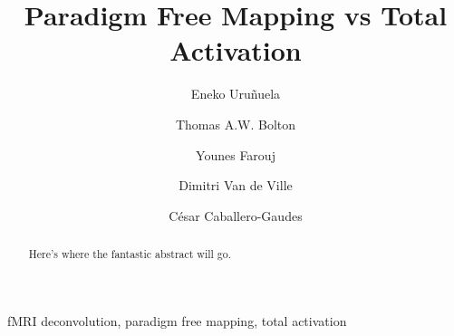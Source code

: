 \documentclass[5p]{elsarticle}
\begin{document}
\begin{frontmatter}

\title{Paradigm Free Mapping vs Total Activation}

\author[bcbl,upv]{Eneko Uru\~nuela}

\author[japan]{Thomas A.W. Bolton}
\author[epfl]{Younes Farouj}
\author[epfl,unige]{Dimitri Van de Ville}
\author[bcbl]{C\'{e}sar Caballero-Gaudes}

\address[bcbl]{Basque Center on Cognition, Brain and Language (BCBL), Donostia-San Sebasti\'{a}n, Spain.}
\address[upv]{University of the Basque Country, Donostia-San Sebasti\'{a}n, Spain.}
\address[japan]{Department of Decoded Neurofeedback, ATR Computational Neuroscience Laboratories, Kyoto, Japan}
\address[epfl]{Swiss Federal Institute of Technology Lausanne (EPFL), Lausanne, Switzerland.}
\address[unige]{Faculty of Medicine of the University of Geneva, Geneva, Switzerland}

\begin{abstract}
Here's where the fantastic abstract will go.
\end{abstract}

\begin{keyword}
fMRI deconvolution, paradigm free mapping, total activation
\end{keyword}

\end{frontmatter}

\linenumbers











\end{document}

